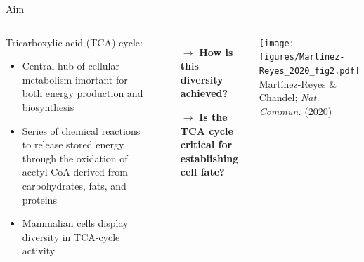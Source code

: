 \documentclass[10pt, aspectratio=169]{beamer}
\begin{document}
\begin{frame}{Aim}
\begin{columns}

\begin{block}{\centering Tricarboxylic acid (TCA) cycle:}
\vspace{0.2cm}
    \begin{itemize}
        \item Central hub of cellular metabolism imortant for both energy production and biosynthesis \\[0.2cm]
        \item Series of chemical reactions to release stored energy through the oxidation of acetyl-CoA derived from carbohydrates, fats, and proteins\\[0.2cm]
        \item Mammalian cells display diversity in TCA-cycle activity \\[0.2cm]
    \end{itemize}
\vspace{0.2cm}
\end{block}

\vspace{0.3cm}

\begin{itemize}
    \item[$\rightarrow$] \textbf{How is this diversity achieved?} \\[0.3cm]
    \item[$\rightarrow$] \textbf{Is the TCA cycle critical for establishing cell fate?}
\end{itemize}

\centering
\texttt{[image: figures/Martínez-Reyes\_2020\_fig2.pdf]}\\[0.1cm]
\tiny{Martínez-Reyes \& Chandel; \textit{Nat. Commun.} (2020)}
\end{columns}
\end{frame}
\end{document}
